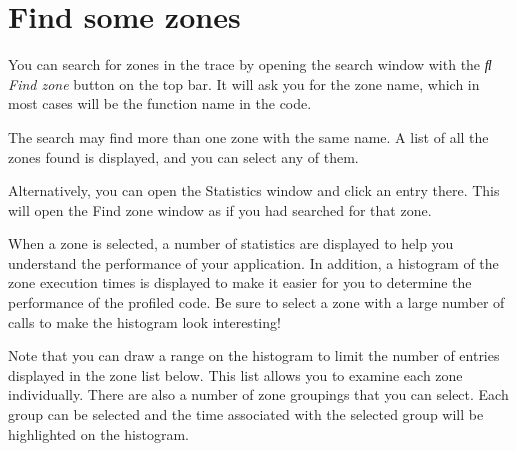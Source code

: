 \chapter{Find some zones }
\hypertarget{md__mono_engine_2thirdparty_2tracy_2profiler_2src_2achievements_2_find_zone}{}\label{md__mono_engine_2thirdparty_2tracy_2profiler_2src_2achievements_2_find_zone}
\label{md__mono_engine_2thirdparty_2tracy_2profiler_2src_2achievements_2_find_zone_autotoc_md1105}%
%


You can search for zones in the trace by opening the search window with the {\itshape  Find zone} button on the top bar. It will ask you for the zone name, which in most cases will be the function name in the code.

The search may find more than one zone with the same name. A list of all the zones found is displayed, and you can select any of them.

Alternatively, you can open the Statistics window and click an entry there. This will open the Find zone window as if you had searched for that zone.

When a zone is selected, a number of statistics are displayed to help you understand the performance of your application. In addition, a histogram of the zone execution times is displayed to make it easier for you to determine the performance of the profiled code. Be sure to select a zone with a large number of calls to make the histogram look interesting!

Note that you can draw a range on the histogram to limit the number of entries displayed in the zone list below. This list allows you to examine each zone individually. There are also a number of zone groupings that you can select. Each group can be selected and the time associated with the selected group will be highlighted on the histogram. 
